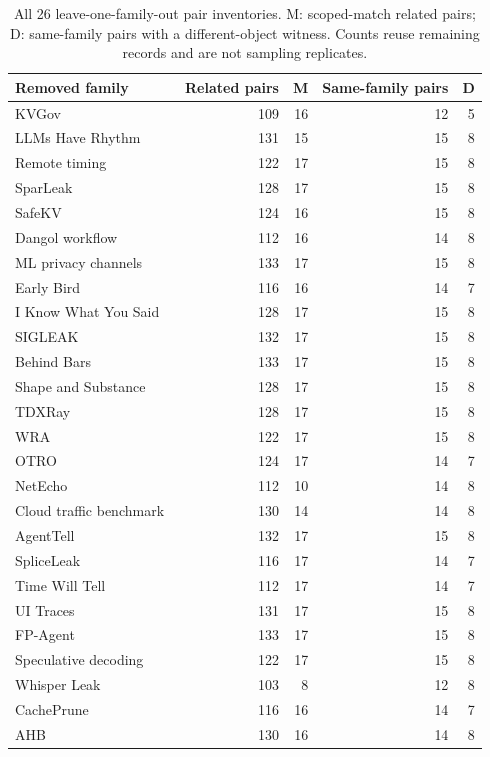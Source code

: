 \clearpage
\begin{table}[ht]\centering\small
\caption{All 26 leave-one-family-out pair inventories. M: scoped-match related pairs; D: same-family pairs with a different-object witness. Counts reuse remaining records and are not sampling replicates.}\label{tab:r25-deletions}
\begin{tabular}{@{}lrrrr@{}}\toprule
Removed family & Related pairs & M & Same-family pairs & D\\\midrule
KVGov~\cite{addagada2026kvgov} & 109 & 16 & 12 & 5\\
LLMs Have Rhythm~\cite{alhazbi2025rhythm} & 131 & 15 & 15 & 8\\
Remote timing~\cite{carlini2024remote} & 122 & 17 & 15 & 8\\
SparLeak~\cite{chen2026sparleak} & 128 & 17 & 15 & 8\\
SafeKV~\cite{chu2025safekv} & 124 & 16 & 15 & 8\\
Dangol workflow~\cite{dangol2026workflow} & 112 & 16 & 14 & 8\\
ML privacy channels~\cite{debenedetti2024privacy} & 133 & 17 & 15 & 8\\
Early Bird~\cite{earlybird2025} & 116 & 16 & 14 & 7\\
I Know What You Said~\cite{gao2025iknow} & 128 & 17 & 15 & 8\\
SIGLEAK~\cite{geng2026sigleak} & 132 & 17 & 15 & 8\\
Behind Bars~\cite{gu2026behindbars} & 133 & 17 & 15 & 8\\
Shape and Substance~\cite{hadad2026shape} & 128 & 17 & 15 & 8\\
TDXRay~\cite{hornetz2026tdxray} & 128 & 17 & 15 & 8\\
WRA~\cite{jeong2026wra} & 122 & 17 & 15 & 8\\
OTRO~\cite{lee2026otro} & 124 & 17 & 14 & 7\\
NetEcho~\cite{netecho2025} & 112 & 10 & 14 & 8\\
Cloud traffic benchmark~\cite{pouryousef2026traffic} & 130 & 14 & 14 & 8\\
AgentTell~\cite{shahriar2026agenttell} & 132 & 17 & 15 & 8\\
SpliceLeak~\cite{spliceleak2026} & 116 & 17 & 14 & 7\\
Time Will Tell~\cite{timewilltell2024} & 112 & 17 & 14 & 7\\
UI Traces~\cite{uitraces2026} & 131 & 17 & 15 & 8\\
FP-Agent~\cite{wang2026fpagent} & 133 & 17 & 15 & 8\\
Speculative decoding~\cite{wei2024speculation} & 122 & 17 & 15 & 8\\
Whisper Leak~\cite{whisperleak2025} & 103 & 8 & 12 & 8\\
CachePrune~\cite{wu2026cacheprune} & 116 & 16 & 14 & 7\\
AHB~\cite{zhu2026turing} & 130 & 16 & 14 & 8\\
\bottomrule\end{tabular}\end{table}
